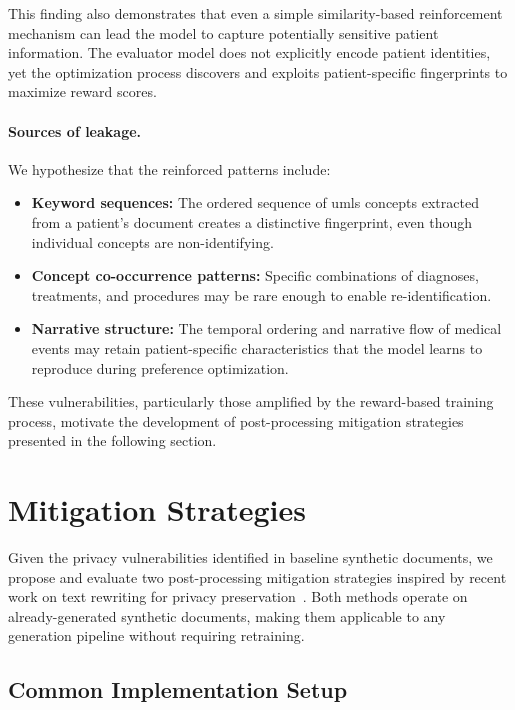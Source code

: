 This finding also demonstrates that even a simple similarity-based reinforcement mechanism can lead the model to capture potentially sensitive patient information. The evaluator model does not explicitly encode patient identities, yet the optimization process discovers and exploits patient-specific fingerprints to maximize reward scores.

\paragraph{Sources of leakage.} We hypothesize that the reinforced patterns include:

\begin{itemize}
    \item \textbf{Keyword sequences:} The ordered sequence of \gls{umls} concepts extracted from a patient's document creates a distinctive fingerprint, even though individual concepts are non-identifying.
    
    \item \textbf{Concept co-occurrence patterns:} Specific combinations of diagnoses, treatments, and procedures may be rare enough to enable re-identification.
    
    \item \textbf{Narrative structure:} The temporal ordering and narrative flow of medical events may retain patient-specific characteristics that the model learns to reproduce during preference optimization.
\end{itemize}

These vulnerabilities, particularly those amplified by the reward-based training process, motivate the development of post-processing mitigation strategies presented in the following section.

\section{Mitigation Strategies}
\label{sec:mitigation}

Given the privacy vulnerabilities identified in baseline synthetic documents, we propose and evaluate two post-processing mitigation strategies inspired by recent work on text rewriting for privacy preservation~\cite{igamberdiev2024rewriteagain}. Both methods operate on already-generated synthetic documents, making them applicable to any generation pipeline without requiring retraining.

\subsection{Common Implementation Setup}
\label{subsec:mitigation_setup}

